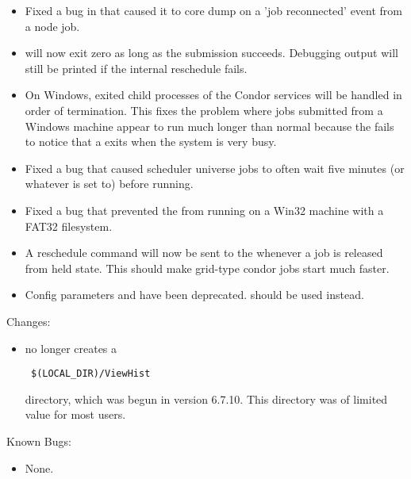\begin{itemize}
\item Fixed a bug in  that caused it to core dump on
a 'job reconnected' event from a node job.

\item {} will now exit zero as long as the submission succeeds.  Debugging output will still be printed if the internal reschedule fails.

\item On Windows, exited child processes of the Condor services
will be handled in order of termination.  This fixes the problem where jobs
submitted from a Windows machine appear to run much longer than normal
because the  fails to notice that a  exits
when the system is very busy.

\item Fixed a bug that caused scheduler universe jobs to often wait five
minutes (or whatever  is set to) before running.

\item Fixed a bug that prevented the  from running on a
Win32 machine with a FAT32 filesystem.

\item A reschedule command will now be sent to the  whenever
a job is released from held state. This should make grid-type condor jobs
start much faster.

\item Config parameters  and  have been
deprecated.  should be used instead.

\end{itemize}

\noindent Changes:

\begin{itemize}

\item {} no longer creates a
\begin{verbatim} $(LOCAL_DIR)/ViewHist \end{verbatim}
directory, which was begun in version 6.7.10.  This directory was of limited
value for most users.

\end{itemize}

\noindent Known Bugs:

\begin{itemize}

\item None.

\end{itemize}



